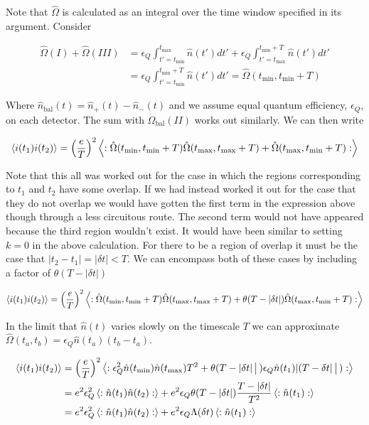 \documentclass[12pt]{article}
\begin{document}
Note that $\hat{\Omega}$ is calculated as an integral over the time window specified in its argument. Consider 

\begin{align}
\hat{\Omega}(I) + \hat{\Omega}(III) &= \epsilon_Q\int_{t'=t_{\text{min}}}^{t_{\text{max}}}\hat{n}(t') dt' + \epsilon_Q\int_{t'=t_{\text{max}}}^{t_{\text{min}}+T}\hat{n}(t') dt'\\
&=\epsilon_Q\int_{t'=t_{\text{min}}}^{t_{\text{min}}+T}\hat{n}(t') dt' = \hat{\Omega}(t_{\text{min}},t_{\text{min}}+T)
\end{align}

Where $\hat{n}_{\text{bal}}(t) = \hat{n}_+(t) - \hat{n}_-(t)$ and we assume equal quantum efficiency, $\epsilon_Q$, on each detector.
The sum with $\hat{\Omega}_{\text{bal}}(II)$ works out similarly. We can then write

\begin{align}
\Braket{i(t_1)i(t_2)} = \left(\frac{e}{T}\right)^2 \Braket{:\hat{\Omega}(t_{\text{min}},t_{\text{min}}+T)\hat{\Omega}(t_{\text{max}},t_{\text{max}}+T) + \hat{\Omega}(t_{\text{max}},t_{\text{min}}+T) :}
\end{align}

Note that this all was worked out for the case in which the regions corresponding to $t_1$ and $t_2$ have some overlap. If we had instead worked it out for the case that they do not overlap we would have gotten the first term in the expression above though through a less circuitous route. The second term would not have appeared because the third region wouldn't exist. It would have been similar to setting $k=0$ in the above calculation. For there to be a region of overlap it must be the case that $|t_2-t_1|=|\delta t|<T$. We can encompass both of these cases by including a factor of $\theta(T-\lvert\delta t \rvert)$

\begin{align}
\Braket{i(t_1)i(t_2)} = \left(\frac{e}{T}\right)^2 \Braket{:\hat{\Omega}(t_{\text{min}},t_{\text{min}}+T)\hat{\Omega}(t_{\text{max}},t_{\text{max}}+T) + \theta(T-\lvert\delta t\rvert) \hat{\Omega}(t_{\text{max}},t_{\text{min}}+T) :}
\end{align}

In the limit that $\hat{n}(t)$ varies slowly on the timescale $T$ we can approximate $\hat{\Omega}(t_a,t_b) = \epsilon_Q \hat{n}(t_a) (t_b-t_a)$.

\begin{align}
\Braket{i(t_1)i(t_2)} &= \left(\frac{e}{T}\right)^2 \Braket{:\epsilon_Q^2\hat{n}(t_{\text{min}})\hat{n}(t_{\text{max}})T^2 + \theta(T-\lvert \delta t\rvert|)\epsilon_Q\hat{n}(t_1)\lvert (T-\delta t \rvert|):}\\
&=e^2 \epsilon_Q^2 \Braket{:\hat{n}(t_1)\hat{n}(t_2):} + e^2 \epsilon_Q \theta(T-\lvert \delta t\rvert) \frac{T-\lvert \delta t\rvert}{T^2} \braket{:\hat{n}(t_1):}\\
&=e^2 \epsilon_Q^2 \Braket{:\hat{n}(t_1)\hat{n}(t_2):} + e^2 \epsilon_Q \Lambda(\delta t) \braket{:\hat{n}(t_1):}
\end{align}
\end{document}
